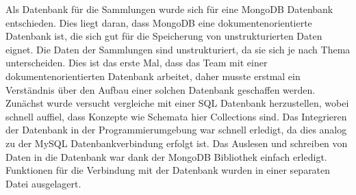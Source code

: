 Als Datenbank für die Sammlungen wurde sich für eine MongoDB Datenbank entschieden.
Dies liegt daran, dass MongoDB eine dokumentenorientierte Datenbank ist, die sich gut für die Speicherung von unstrukturierten Daten eignet.
Die Daten der Sammlungen sind unstrukturiert, da sie sich je nach Thema unterscheiden.
Dies ist das erste Mal, dass das Team mit einer dokumentenorientierten Datenbank arbeitet, daher musste erstmal ein Verständnis über den Aufbau einer solchen Datenbank geschaffen werden.
Zunächst wurde versucht vergleiche mit einer SQL Datenbank herzustellen, wobei schnell auffiel, dass Konzepte wie Schemata hier Collections sind.
Das Integrieren der Datenbank in der Programmierumgebung war schnell erledigt, da dies analog zu der MySQL Datenbankverbindung erfolgt ist.
Das Auslesen und schreiben von Daten in die Datenbank war dank der MongoDB Bibliothek einfach erledigt.
Funktionen für die Verbindung mit der Datenbank wurden in einer separaten Datei ausgelagert.